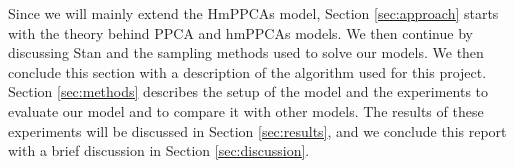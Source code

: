 
Since we will mainly extend the HmPPCAs model, Section \ref{sec:approach} starts with the theory behind PPCA and hmPPCAs models. We then continue by discussing Stan and the sampling methods used to solve our models. We then conclude this section with a description of the algorithm used for this project. Section \ref{sec:methods} describes the setup of the model and the experiments to evaluate our model and to compare it with other models. The results of these experiments will be discussed in Section \ref{sec:results}, and we conclude this report with a brief discussion in Section \ref{sec:discussion}.
